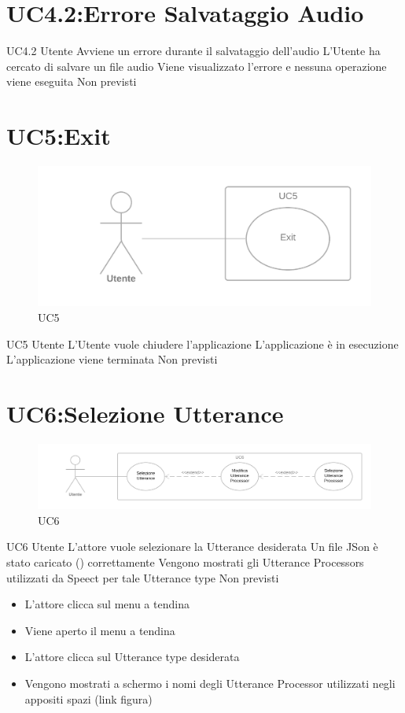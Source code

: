 \documentclass[../AnalisideiRequisiti.tex]{subfiles}
\begin{document}
\section{UC4.2:Errore Salvataggio Audio}
\UserCase
{UC4.2}
{Utente}
{}
{Avviene un errore durante il salvataggio dell'audio}
{L'Utente ha cercato di salvare un file audio}
{Viene visualizzato l'errore e nessuna operazione viene eseguita}
{Non previsti}
{}

\section{UC5:Exit}
\begin{figure}[H]
	\caption{UC5}
	\centering
	\includegraphics[width=\textwidth]{../img/UC05.png}
\end{figure}
\UserCase
{UC5}
{Utente}
{}
{L'Utente vuole chiudere l'applicazione }
{L'applicazione è in esecuzione}
{L'applicazione viene terminata}
{Non previsti}
{
}

\section{UC6:Selezione Utterance}
\begin{figure}[H]
	\caption{UC6}
	\centering
	\includegraphics[width=\textwidth]{../img/UC06.png}
\end{figure}
\UserCase
{UC6}
{Utente}
{}
{L'attore vuole selezionare la Utterance desiderata}
{Un file JSon è stato caricato () correttamente }
{Vengono mostrati gli Utterance Processors utilizzati da Speect per tale Utterance type}
{Non previsti}
{
	\begin{itemize}
		\item{} L'attore clicca sul menu a tendina
		\item{} Viene aperto il menu a tendina
		\item{} L'attore clicca sul Utterance type desiderata
		\item{} Vengono mostrati a schermo i nomi degli Utterance Processor utilizzati negli appositi spazi (link figura)		
	\end{itemize}
}
\end{document}
